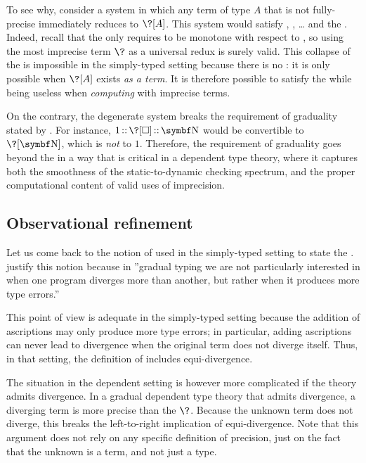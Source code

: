 To see why, consider a system in which any term of type $A$ that is not
fully-precise immediately reduces to $\?[A]$.
This system would satisfy , , …
and the . Indeed, recall that the  only requires 
to be monotone with respect to , so using the most imprecise term
$\?$ as a universal redux is surely valid. This collapse of the 
is impossible in the simply-typed setting because there is no :
it is only possible when $\?[A]$ exists \emph{as a term}.
It is therefore possible to satisfy the  while being useless when
\emph{computing} with imprecise terms.

On the contrary, the degenerate system breaks the  requirement of graduality stated by .
For instance, $\asc{\asc{1}{\?[\uni]}}{\Nat}$ would be convertible to $\?[\Nat]$,
which is \emph{not}  to $1$.
Therefore, the  requirement of graduality goes beyond the
 in a way that is critical in a dependent type theory,
where it captures both the smoothness of the static-to-dynamic checking spectrum,
and the proper computational content of valid uses of imprecision.

\subsection{Observational refinement}

Let us come back to the notion of  used in the simply-typed setting to state the
.
\textcite{New2018} justify this notion because in
”gradual typing we are not particularly interested in
when one program diverges more than another, but rather when it
produces more type errors.”

%
This point of view is adequate in the simply-typed setting because
the addition of ascriptions may only produce more type errors; in particular, 
adding ascriptions can never lead to divergence
when the original term does not diverge itself.
%
Thus, in that setting, the definition of 
includes equi-divergence.
%

The situation in the dependent setting is however more
complicated if the theory admits divergence.%
In a gradual dependent type theory that admits divergence,
a diverging term is more precise than the
 $\?$. Because the unknown term does not diverge, this
breaks the left-to-right implication of
equi-divergence. Note that this argument does not rely on any specific definition of precision, 
just on the fact that the unknown is a term, and not just a type.

